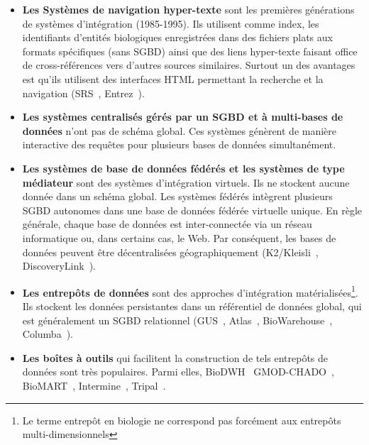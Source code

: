 \begin{itemize}
 
 \item \textbf{Les Systèmes de navigation hyper-texte} sont les premières générations de systèmes d'intégration (1985-1995). Ils utilisent comme index, les identifiants d'entités biologiques enregistrées dans des fichiers plats aux formats spécifiques (sans SGBD) ainsi que des liens hyper-texte faisant office de cross-références vers d'autres sources similaires. Surtout un des avantages est qu'ils utilisent des interfaces HTML permettant la recherche et la navigation (SRS~\cite{srs}, Entrez~\cite{entrez}). \\
 
 \item \textbf{Les systèmes centralisés gérés par un SGBD et à multi-bases de données} n'ont pas de schéma global. Ces systèmes génèrent de manière interactive des requêtes pour plusieurs bases de données simultanément. \\
 
 \item \textbf{Les systèmes de base de données fédérés et les systèmes de type médiateur} sont des systèmes d'intégration virtuels. Ils ne stockent aucune donnée dans un schéma global. Les systèmes fédérés intègrent plusieurs SGBD autonomes dans une base de données fédérée virtuelle unique. En règle générale, chaque base de données est inter-connectée via un réseau informatique ou, dans certains cas, le Web. Par conséquent, les bases de données peuvent être décentralisées géographiquement (K2/Kleisli~\cite{k2kleisli}, DiscoveryLink~\cite{discoverylink}).\\
 
 \item \textbf{Les entrepôts de données} sont des approches d'intégration matérialisées\footnote{Le terme entrepôt en biologie ne correspond pas forcément aux entrepôts multi-dimensionnels}. Ils stockent les données persistantes dans un référentiel de données global, qui est généralement un SGBD relationnel (GUS~\cite{k2kleisli}, Atlas~\cite{atlas}, BioWarehouse~\cite{biowarehouse}, Columba~\cite{columba}).\\
\item \textbf{Les boîtes à outils} qui facilitent la construction de tels entrepôts de données sont très populaires. Parmi elles, BioDWH~\cite{biodwh} GMOD-CHADO~\cite{chado_2006}, BioMART~\cite{biomart2009}, Intermine~\cite{intermine_2012}, Tripal~\cite{tripal_2011,tripal_2013,tripal_2018}.\\


\end{itemize}
